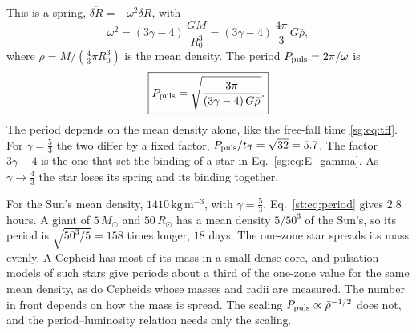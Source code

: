 This is a spring, $\delta\ddot R=-\omega^2\delta R$, with
\begin{equation}
	\omega^2=(3\gamma-4)\,\frac{GM}{R_0^3}=(3\gamma-4)\,\frac{4\pi}{3}\,G\bar\rho ,
\end{equation}
where $\bar\rho=M/(\tfrac43\pi R_0^3)$ is the mean density. The period $P_{\rm puls}=2\pi/\omega$ is
\begin{equation}
	\boxed{P_{\rm puls}=\sqrt{\frac{3\pi}{(3\gamma-4)\,G\bar\rho}}.}
	\label{st:eq:period}
\end{equation}
The period depends on the mean density alone, like the free-fall time \eqref{sg:eq:tff}. For $\gamma=\tfrac53$ the two differ by a fixed factor, $P_{\rm puls}/t_{\rm ff}=\sqrt{32}=5.7$. The factor $3\gamma-4$ is the one that set the binding of a star in Eq.~\eqref{sg:eq:E_gamma}. As $\gamma\to\tfrac43$ the star loses its spring and its binding together.

For the Sun's mean density, $1410\,\mathrm{kg\,m^{-3}}$, with $\gamma=\tfrac53$, Eq.~\eqref{st:eq:period} gives $2.8$ hours. A giant of $5\,M_\odot$ and $50\,R_\odot$ has a mean density $5/50^3$ of the Sun's, so its period is $\sqrt{50^3/5}=158$ times longer, $18$ days. The one-zone star spreads its mass evenly. A Cepheid has most of its mass in a small dense core, and pulsation models of such stars give periods about a third of the one-zone value for the same mean density, as do Cepheids whose masses and radii are measured. The number in front depends on how the mass is spread. The scaling $P_{\rm puls}\propto\bar\rho^{-1/2}$ does not, and the period--luminosity relation needs only the scaling.

